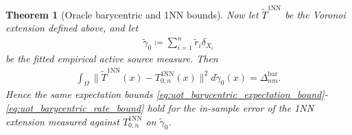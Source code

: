 \documentclass[11pt,reqno]{amsart}
\newtheorem{theorem}{Theorem}
\theoremstyle{definition}
\renewcommand{\tilde}{\widetilde}
\begin{document}
\begin{theorem}[Oracle barycentric and 1NN bounds]
Now let $\tilde T^{\mathrm{1NN}}$ be the Voronoi extension defined above, and let
\begin{align}
    \tilde\gamma_0 \coloneqq \sum_{i=1}^n \tilde r_i   \delta_{X_i}
\end{align}
be the fitted empirical active source measure.
Then
 \begin{align}
 \label{eq:uot_1nn_identity_active_empirical}
    \int_\Omega \|\tilde T^{\mathrm{1NN}}(x)-T_{0,n}^{\mathrm{1NN}}(x)\|^2  d\tilde\gamma_0(x)
     =
     \Delta_{nm}^{\mathrm{bar}}.
 \end{align}
Hence the same expectation bounds \eqref{eq:uot_barycentric_expectation_bound}-\eqref{eq:uot_barycentric_rate_bound} hold for the in-sample error of the 1NN extension measured against $T_{0,n}^{\mathrm{1NN}}$ on $\tilde\gamma_0$.
 \end{theorem}
\end{document}
